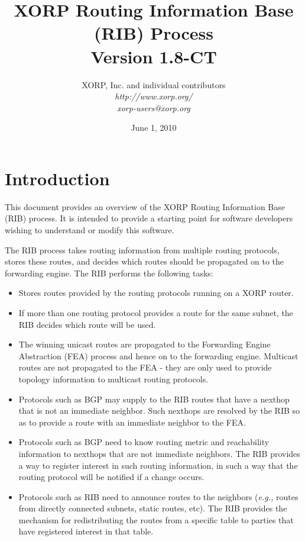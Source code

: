 \documentclass[11pt]{article}
\newcommand{\eg}{\emph{e.g.,}\xspace}
\begin{document}
\title{XORP Routing Information Base (RIB) Process \\
\vspace{1ex}
Version 1.8-CT}
\author{ XORP, Inc. and individual contributors		\\
         {\it http://www.xorp.org/}			\\
	 {\it xorp-users@xorp.org}
}
\date{June 1, 2010}

\maketitle


\section{Introduction}

This document provides an overview of the XORP Routing Information
Base (RIB) process.  It is intended to provide a starting point for
software developers wishing to understand or modify this software.

The RIB process takes routing information from multiple routing
protocols, stores these routes, and decides which routes should be
propagated on to the forwarding engine.  The RIB performs the following
tasks:

\begin{itemize}

  \item Stores routes provided by the routing protocols running on a XORP
  router.

  \item If more than one routing protocol provides a route for the same
  subnet, the RIB decides which route will be used.

  \item The winning unicast routes are propagated to the Forwarding
  Engine Abstraction (FEA) process and hence on to the forwarding
  engine. Multicast routes are not propagated to the FEA - they are only
  used to provide topology information to multicast routing protocols.

  \item Protocols such as BGP may supply to the RIB routes that have a
  nexthop that is not an immediate neighbor.  Such nexthops are resolved
  by the RIB so as to provide a route with an immediate neighbor to the
  FEA.

  \item Protocols such as BGP need to know routing metric and
  reachability information to nexthops that are not immediate neighbors.
  The RIB provides a way to register interest in such routing
  information, in such a way that the routing protocol will be notified
  if a change occurs.

  \item Protocols such as RIB need to announce routes to the neighbors
  (\eg routes from directly connected subnets, static routes, etc).
  The RIB provides the mechanism for redistributing the routes from
  a specific table to parties that have registered interest in that
  table.

\end{itemize}
\end{document}
